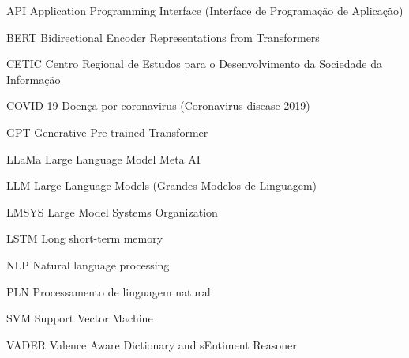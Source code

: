 \documentclass[
	12pt,					%
	openright,				%
	oneside,					%
	a4paper,					%
	english,					%
	brazil					%
	]{abntex2}
\begin{document}
\frenchspacing

\pretextual



\imprimirfolhaderosto*



% 





% 



\listoffigures*
\cleardoublepage

\listoftables*
\cleardoublepage

\begin{siglas}
	\item[API] Application Programming Interface (Interface de Programação de Aplicação)
	\item[BERT] Bidirectional Encoder Representations from Transformers
	\item[CETIC] Centro Regional de Estudos para o Desenvolvimento da Sociedade da Informação
	\item[COVID-19] Doença por coronavirus (Coronavirus disease 2019)
	\item[GPT] Generative Pre-trained Transformer
	\item[LLaMa] Large Language Model Meta AI
	\item[LLM] Large Language Models (Grandes Modelos de Linguagem)
	\item[LMSYS] Large Model Systems Organization
	\item[LSTM] Long short-term memory
	\item[NLP] Natural language processing
	\item[PLN] Processamento de linguagem natural
	\item[SVM] Support Vector Machine
	\item[VADER] Valence Aware Dictionary and sEntiment Reasoner
\end{siglas}
\end{document}
